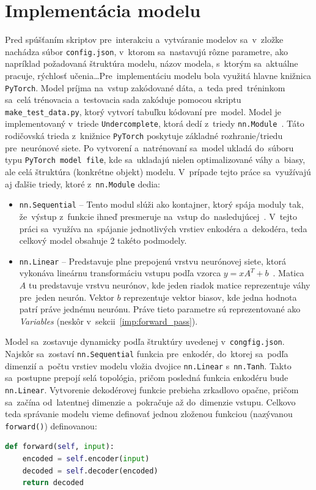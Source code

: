 \section{Implementácia modelu}
Pred spúšťaním skriptov pre~interakciu a~vytváranie modelov sa~v~zložke nachádza súbor \texttt{config.json}, v~ktorom sa~nastavujú rôzne parametre, ako napríklad požadovaná štruktúra modelu, názov modela, s~ktorým sa~aktuálne pracuje, rýchlosť učenia\dots Pre~implementáciu modelu bola využitá hlavne knižnica \texttt{PyTorch}. Model príjma na~vstup zakódované dáta, a~teda pred~tréninkom sa~celá trénovacia a~testovacia sada zakóduje pomocou skriptu \texttt{make\_test\_data.py}, ktorý vytvorí tabuľku kódovaní pre~model. Model je implementovaný v~triede \texttt{Undercomplete}, ktorá dedí z~triedy \texttt{nn.Module}~\cite{nn.module}. Táto rodičovská trieda z~knižnice \texttt{PyTorch} poskytuje základné rozhranie/triedu pre~neurónové siete. Po vytvorení a~natrénovaní sa~model ukladá do~súboru typu \texttt{PyTorch model file}, kde sa~ukladajú nielen optimalizované váhy a~biasy, ale celá štruktúra (konkrétne objekt) modelu. V~prípade tejto práce sa~využívajú aj ďalšie triedy, ktoré z~\texttt{nn.Module} dedia:
\begin{itemize}
    \item \texttt{nn.Sequential} -- Tento modul slúži ako kontajner, ktorý spája moduly tak, že~výstup z~funkcie ihneď presmeruje na~vstup do~nasledujúcej~\cite{pytorch.sequential}. V~tejto práci sa~využíva na~spájanie jednotlivých vrstiev enkodéra a~dekodéra, teda celkový model obsahuje 2 takéto podmodely.  
    \item \texttt{nn.Linear} -- Predstavuje plne prepojenú vrstvu neurónovej siete, ktorá vykonáva lineárnu transformáciu vstupu podľa vzorca $y = x A^T + b$~\cite{pytorch.linear}. Matica $A$ tu predstavuje vrstvu neurónov, kde jeden riadok matice reprezentuje váhy pre~jeden neurón. Vektor $b$ reprezentuje vektor biasov, kde jedna hodnota patrí práve jednému neurónu. Práve tieto parametre sú reprezentované ako \textit{Variables} (neskôr v~sekcii~\ref{imp:forward_pass}).
\end{itemize}

Model sa~zostavuje dynamicky podľa štruktúry uvedenej v~\texttt{congfig.json}. Najskôr sa~zostaví \texttt{nn.Sequential} funkcia pre~enkodér, do~ktorej sa~podľa dimenzií a~počtu vrstiev modelu vložia dvojice \texttt{nn.Linear} s~\texttt{nn.Tanh}. Takto sa~postupne prepojí selá topológia, pričom posledná funkcia enkodéru bude \texttt{nn.Linear}. Vytvorenie dekodérovej funkcie prebieha zrkadlovo opačne, pričom sa~začína od~latentnej dimenzie a~pokračuje až do~dimenzie vstupu. Celkovo teda správanie modelu vieme definovať jednou zloženou funkciou (nazývanou \texttt{forward()}) definovanou:
\begin{lstlisting}[language=Python, caption={Hlavná funkcia autoenkodéru}]
def forward(self, input):
    encoded = self.encoder(input)
    decoded = self.decoder(encoded)
    return decoded
\end{lstlisting}

